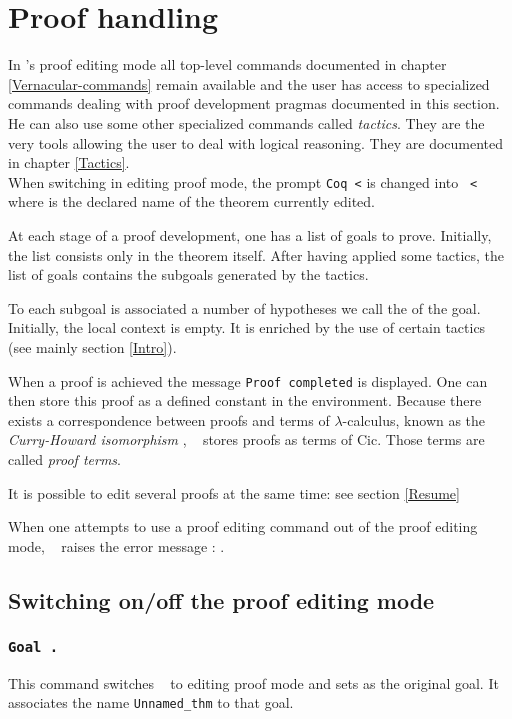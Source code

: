 \chapter{Proof handling}
\label{Proof-handling}

In \Coq's proof editing mode all top-level commands documented in 
chapter \ref{Vernacular-commands} remain available
and the user has access to specialized commands dealing with proof
development pragmas documented in this section. He can also use some
other specialized commands called {\em tactics}.  They are the very
tools allowing the user to deal with logical reasoning. They are
documented in chapter \ref{Tactics}.\\ 
When switching in editing proof mode, the prompt
{\tt Coq <} is changed into {\tt {\ident} <} where {\ident} is the
declared name of the theorem currently edited.

At each stage of a proof development, one has a list of goals to
prove. Initially, the list consists only in the theorem itself. After
having applied some tactics, the list of goals contains the subgoals
generated by the tactics.

To each subgoal is associated  a number of
hypotheses we call the {\em {}} of the goal.
Initially, the local context is empty. It is enriched by the use of
certain tactics (see mainly section \ref{Intro}).

When a proof is achieved the message {\tt Proof completed} is
displayed. One can then store this proof as a defined constant in the
environment. Because there exists a correspondence between proofs and
terms of $\lambda$-calculus, known as the {\em Curry-Howard
isomorphism} \cite{How80,Bar91,Gir89,Hue89}, \Coq~ stores proofs as
terms of {\sc Cic}. Those terms are called {\em proof
  terms}.

It is possible to edit several proofs at the same time: see section
\ref{Resume}

\ErrMsg When one attempts to use a proof editing command out of the
proof editing mode, \Coq~ raises the error message : .

\section{Switching on/off the proof editing mode}

\subsection{\tt Goal {\form}.}
\label{Goal}
This command switches \Coq~ to editing proof mode and sets {\form} as
the original goal. It associates the name {\tt Unnamed\_thm} to
that goal.

